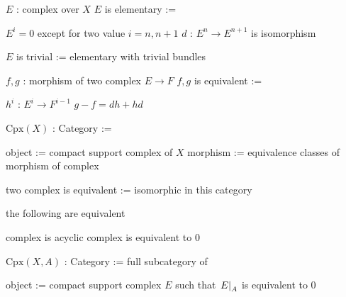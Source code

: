 \documentclass[dvipdfmx]{jsarticle}
\begin{document}
\begin{Definition}
\itemenum \(E\) : complex over \(X\)
\itemthen \THENLINE
\itemwith \(E\) is elementary :=
\begin{itemize}
\itemwith \(E^i = 0\) except for two value \(i = n, n+1\) 
\itemwith \(d\) : \(E^n \to E^{n+1}\) is isomorphism 
\end{itemize}
\itemwith \(E\) is trivial := elementary with trivial bundles
\end{Definition}

\begin{Definition}
\itemenum \(f,g\) : morphism of two complex \(E \to F\)
\itemthen \THENLINE
\itemwith \(f,g\) is equivalent :=
  \begin{itemize}
    \itemenum \(h^i\) : \(E^i \to F^{i-1}\)
    \itemwith \(g - f = dh + hd\)
  \end{itemize}
\end{Definition}

\newcommand{\CpxCat}[1]{\text{Cpx}(#1)}
\begin{Definition}
\itemthen \THENLINE
\itemenum \(\CpxCat{X}\) : Category :=
  \begin{itemize}
    \itemenum object := compact support complex of \(X\)
    \itemenum morphism := equivalence classes of morphism of complex 
  \end{itemize}
\itemwith two complex is equivalent := isomorphic in this category 
\end{Definition}

\begin{Theorem}
\itemthen \THENLINE
\itemwith the following are equivalent
\begin{itemize}
  \itemwith complex is acyclic
  \itemwith complex is equivalent to \(0\)
\end{itemize}
\end{Theorem}

\newcommand{\CpxRelCat}[2]{\text{Cpx}(#1, #2)}
\begin{Definition}
\itemthen \THENLINE
\itemenum \(\CpxRelCat{X}{A}\) : Category := full subcategory of 
  \begin{itemize}
  \itemenum object := compact support complex \(E\) such that \(\left. {E} \right| _{A}\) is equivalent to \(0\)
  \end{itemize}
\end{Definition}
\end{document}

